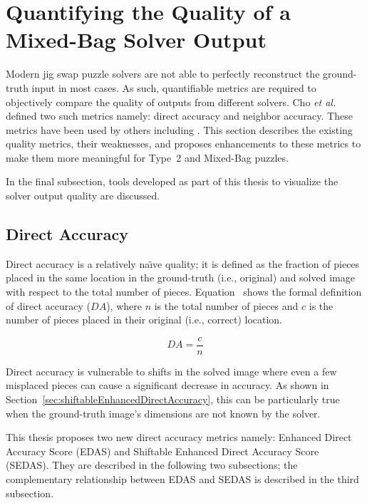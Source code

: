 \chapter{Quantifying the Quality of a Mixed-Bag Solver Output}\label{sec:quantifyingSolverQuantify}

Modern jig swap puzzle solvers are not able to perfectly reconstruct the ground-truth input in most cases.  As such, quantifiable metrics are required to objectively compare the quality of outputs from different solvers.  Cho \textit{et al.} \cite{cho2010} defined two such metrics namely: direct accuracy and neighbor accuracy. These metrics have been used by others including \cite{sholomon2013, pomeranz2011, paikin2015, son2014, gallagher2012}.  This section describes the existing quality metrics, their weaknesses, and proposes enhancements to these metrics to make them more meaningful for Type~2 and Mixed-Bag puzzles.

In the final subsection, tools developed as part of this thesis to visualize the solver output quality are discussed.

\section{Direct Accuracy}\label{sec:directAccuracy}

Direct accuracy is a relatively na\"{\i}ve quality; it is defined as the fraction of pieces placed in the same location in the ground-truth (i.e., original) and solved image with respect to the total number of pieces.  Equation~ shows the formal definition of direct accuracy ($DA$), where $n$ is the total number of pieces and $c$ is the number of pieces placed in their original (i.e., correct) location.

\begin{equation} \label{eq:directAccuracy}
DA = \frac{c}{n}
\end{equation}

Direct accuracy is vulnerable to shifts in the solved image where even a few misplaced pieces can cause a significant decrease in accuracy.  As shown in Section~\ref{sec:shiftableEnhancedDirectAccuracy}, this can be particularly true when the ground-truth image's dimensions are not known by the solver.

This thesis proposes two new direct accuracy metrics namely: Enhanced Direct Accuracy Score (EDAS) and Shiftable Enhanced Direct Accuracy Score (SEDAS).  They are described in the following two subsections; the complementary relationship between EDAS and SEDAS is described in the third subsection.

